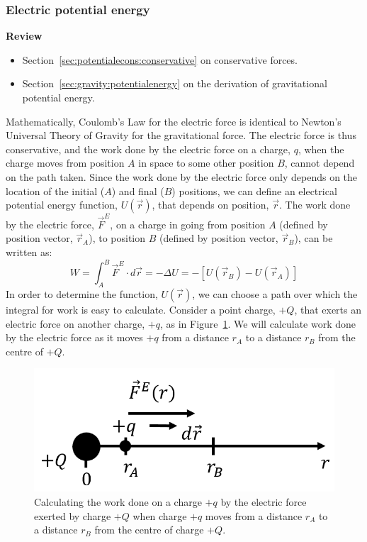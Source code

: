 \subsubsection{Electric potential energy}\label{sec:potential:potentialdefinition}

\begin{framed}
\textbf{Review}\\
\begin{itemize}
\item Section~\ref{sec:potentialecons:conservative} on conservative forces.
\item Section~\ref{sec:gravity:potentialenergy} on the derivation of gravitational potential energy.
\end{itemize}
\end{framed}

Mathematically, Coulomb's Law for the electric force is identical to Newton's Universal Theory of Gravity for the gravitational force. The electric force is thus conservative, and the work done by the electric force on a charge, $q$, when the charge moves from position $A$ in space to some other position $B$, cannot depend on the path taken. Since the work done by the electric force only depends on the location of the initial ($A$) and final ($B$) positions, we can define an electrical potential energy function, $U(\vec r)$, that depends on position, $\vec r$. The work done by the electric force, $\vec F^E$,  on a charge in going from position $A$ (defined by position vector, $\vec r_A$), to position $B$ (defined by position vector, $\vec r_B$), can be written as:
\begin{equation}
\label{eqn:potential:potentialwork}
W=\int_A^B \vec F^E\cdot d\vec r=-\Delta U=-\left[ U(\vec r_B)-U(\vec r_A) \right]
\end{equation}
In order to determine the function, $U(\vec r)$, we can choose a path over which the integral for work is easy to calculate. Consider a point charge, $+Q$, that exerts an electric force on another charge, $+q$, as in Figure~\ref{fig:potential:potential}. We will calculate work done by the electric force as it moves $+q$ from a distance $r_A$ to a distance $r_B$ from the centre of $+Q$.

\begin{figure}[!htbp]
\centering
\includegraphics[width=0.5\linewidth]{files/potential-891c4cc60bcc90cd78ce4c04667f85f1.png}
\caption[]{Calculating the work done on a charge $+q$ by the electric force exerted by charge $+Q$ when charge $+q$ moves from a distance $r_A$ to a distance $r_B$ from the centre of charge $+Q$.}
\label{fig:potential:potential}
\end{figure}

